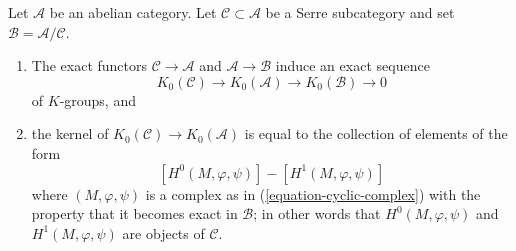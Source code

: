 \begin{lemma}
\label{lemma-serre-subcategory-K-groups}
Let $\mathcal{A}$ be an abelian category.
Let $\mathcal{C} \subset \mathcal{A}$ be a Serre subcategory and
set $\mathcal{B} = \mathcal{A}/\mathcal{C}$.
\begin{enumerate}
\item The exact functors $\mathcal{C} \to \mathcal{A}$ and
$\mathcal{A} \to \mathcal{B}$ induce an exact sequence
$$
K_0(\mathcal{C}) \to
K_0(\mathcal{A}) \to
K_0(\mathcal{B}) \to
0
$$
of $K$-groups, and
\item the kernel of $K_0(\mathcal{C}) \to K_0(\mathcal{A})$ is equal
to the collection of elements of the form
$$
[H^0(M, \varphi, \psi)] - [H^1(M, \varphi, \psi)]
$$
where $(M, \varphi, \psi)$ is a complex as in (\ref{equation-cyclic-complex})
with the property that it becomes exact in $\mathcal{B}$; in other words
that $H^0(M, \varphi, \psi)$ and $H^1(M, \varphi, \psi)$ are
objects of $\mathcal{C}$.
\end{enumerate}
\end{lemma}

